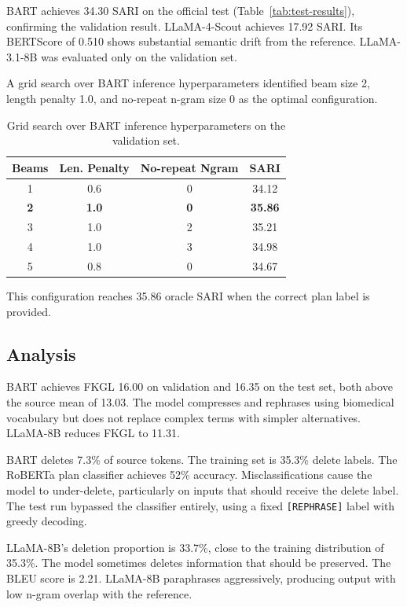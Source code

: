 \documentclass{ceurart}
\begin{document}
BART achieves 34.30 SARI on the official test (Table~\ref{tab:test-results}), confirming the validation result. LLaMA-4-Scout achieves 17.92 SARI. Its BERTScore of 0.510 shows substantial semantic drift from the reference. LLaMA-3.1-8B was evaluated only on the validation set.

A grid search over BART inference hyperparameters identified beam size 2, length penalty 1.0, and no-repeat n-gram size 0 as the optimal configuration.

\begin{table}[t]
\centering
\caption{Grid search over BART inference hyperparameters on the validation set.}
\label{tab:grid}
\begin{tabular}{cccc}
\toprule
Beams & Len. Penalty & No-repeat Ngram & SARI \\
\midrule
1 & 0.6 & 0 & 34.12 \\
\textbf{2} & \textbf{1.0} & \textbf{0} & \textbf{35.86} \\
3 & 1.0 & 2 & 35.21 \\
4 & 1.0 & 3 & 34.98 \\
5 & 0.8 & 0 & 34.67 \\
\bottomrule
\end{tabular}
\end{table}

This configuration reaches 35.86 oracle SARI when the correct plan label is provided.

\subsection{Analysis}

BART achieves FKGL 16.00 on validation and 16.35 on the test set, both above the source mean of 13.03. The model compresses and rephrases using biomedical vocabulary but does not replace complex terms with simpler alternatives. LLaMA-8B reduces FKGL to 11.31.

BART deletes 7.3\% of source tokens. The training set is 35.3\% delete labels. The RoBERTa plan classifier achieves 52\% accuracy. Misclassifications cause the model to under-delete, particularly on inputs that should receive the delete label. The test run bypassed the classifier entirely, using a fixed \texttt{[REPHRASE]} label with greedy decoding.

LLaMA-8B's deletion proportion is 33.7\%, close to the training distribution of 35.3\%. The model sometimes deletes information that should be preserved. The BLEU score is 2.21. LLaMA-8B paraphrases aggressively, producing output with low n-gram overlap with the reference.
\end{document}
